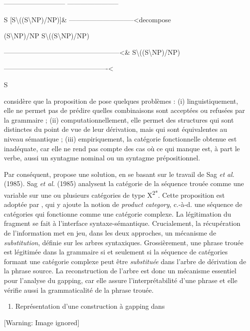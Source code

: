    ---------------------------    -----------------------

       S          [S{\textbackslash}((S{\textbackslash}NP)/NP)]\& -----------------------------{\textless}decompose

 (S{\textbackslash}NP)/NP S{\textbackslash}((S{\textbackslash}NP)/NP)

         ---------------------------------------------------{\textless}\& S{\textbackslash}((S{\textbackslash}NP)/NP)

  ----------------------------------------------{\textless}

      S

\citet{Gardent1991} considère que la proposition de \citet{Steedman1990} pose quelques problèmes : (i) linguistiquement, elle ne permet pas de prédire quelles combinaisons sont acceptées ou refusées par la grammaire ; (ii) computationnellement, elle permet des structures qui sont distinctes du point de vue de leur dérivation, mais qui sont équivalentes au niveau sémantique ; (iii) empiriquement, la catégorie fonctionnelle obtenue est inadéquate, car elle ne rend pas compte des cas où ce qui manque est, à part le verbe, aussi un syntagme nominal ou un syntagme prépositionnel. 

Par conséquent, \citet{Gardent1991} propose une solution, en se basant sur le travail de Sag \textit{et al.} (1985). Sag \textit{et al.} (1985) analysent la catégorie de la séquence trouée comme une variable sur une ou plusieurs catégories de type X\textsuperscript{2*}. Cette proposition est adoptée par \citet{Gardent1991}, qui y ajoute la notion de \textit{product category}, c.-à-d. une séquence de catégories qui fonctionne comme une catégorie complexe. La légitimation du fragment se fait à l'interface syntaxe-sémantique. Crucialement, la récupération de l'information met en jeu, dans les deux approches, un mécanisme de \textit{substitution}, définie sur les arbres syntaxiques. Grossièrement, une phrase trouée est légitimée dans la grammaire si et seulement si la séquence de catégories formant une catégorie complexe peut être \textit{substituée} dans l'arbre de dérivation de la phrase source. La reconstruction de l'arbre est donc un mécanisme essentiel pour l'analyse du gapping, car elle assure l'interprétabilité d'une phrase et elle vérifie aussi la grammaticalité de la phrase trouée.


\begin{enumerate}
\item   Représentation d'une construction à gapping dans \citet{Gardent1991}


\end{enumerate}
{   [Warning: Image ignored] %
} 


